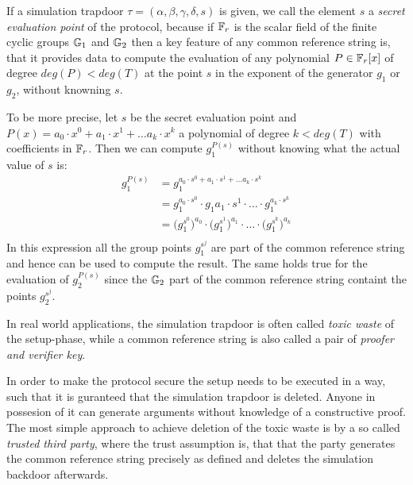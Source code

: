 If a simulation trapdoor $\tau = (\alpha,\beta,\gamma,\delta, s)$ is given, we call the element $s$ a \textit{secret evaluation point} of the protocol, because if $\mathbb{F}_r$ is the scalar field of the finite cyclic groups $\mathbb{G}_1$ and $\mathbb{G}_2$ then a key feature of any common reference string is, that it provides data to compute the evaluation of any polynomial $P\in \mathbb{F}_r[x]$ of degree $deg(P)<deg(T)$ at the point $s$ in the exponent of the generator $g_1$ or $g_2$, without knowning $s$.

To be more precise, let $s$ be the secret evaluation point and $P(x)=a_0\cdot x^0 + a_1\cdot x^1 + \ldots a_k\cdot x^k$ a polynomial of degree $k<deg(T)$ with coefficients in $\mathbb{F}_r$. Then we can compute $g_1^{P(s)}$ without knowing what the actual value of $s$ is:
\begin{align*}
g_1^{P(s)} & = g_1^{a_0\cdot s^0 + a_1\cdot s^1 + \ldots a_k\cdot s^k} \\
 & = g_1^{a_0\cdot s^0} \cdot g_1{a_1\cdot s^1} \cdot \ldots \cdot g_1^{a_k\cdot s^k}\\
 & = \Big(g_1^{s^0}\Big)^{a_0} \cdot \Big(g_1^{s^1}\Big)^{a_1} \cdot \ldots \cdot \Big(g_1^{s^k}\Big)^{a_k}\\
\end{align*}
In this expression all the group points $g_1^{s^j}$ are part of the common reference string and hence can be used to compute the result. The same holds true for the evaluation of $g_2^{P(s)}$ since the $\mathbb{G}_2$ part of the common reference string containt the points $g_2^{s^j}$. 

In real world applications, the simulation trapdoor is often called \textit{toxic waste} of the setup-phase, while a common reference string is also called a pair of \textit{proofer and verifier key}. 

In order to make the protocol secure the setup needs to be executed in a way, such that it is guranteed that the simulation trapdoor is deleted. Anyone in possesion of it can generate arguments without knowledge of a constructive proof. The most simple approach to achieve deletion of the toxic waste is by a so called \textit{trusted third party}, where the trust assumption is, that that the party generates the common reference string precisely as defined and deletes the simulation backdoor afterwards.

